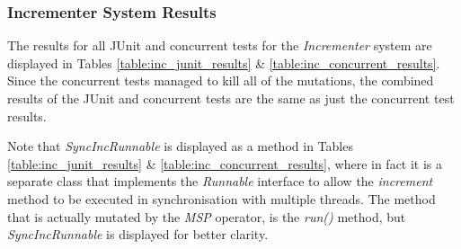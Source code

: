 \documentclass[a4paper,12pt]{article}
\begin{document}
\newpage
 
\subsubsection{Incrementer System Results} \label{section:Incrementer System Results} 

The results for all JUnit and concurrent tests for the \textit{Incrementer} system are displayed in Tables \ref{table:inc_junit_results} \& \ref{table:inc_concurrent_results}. Since the concurrent tests managed to kill all of the mutations, the combined results of the JUnit and concurrent tests are the same as just the concurrent test results.

Note that \textit{SyncIncRunnable} is displayed as a method in Tables \ref{table:inc_junit_results} \& \ref{table:inc_concurrent_results}, where in fact it is a separate class that implements the \textit{Runnable} interface to allow the \textit{increment} method to be executed in synchronisation with multiple threads. The method that is actually mutated by the \textit{MSP} operator, is the \textit{run()} method, but \textit{SyncIncRunnable} is displayed for better clarity.
\end{document}
